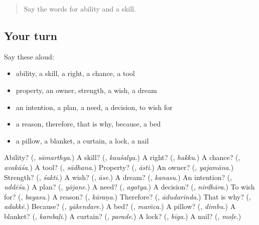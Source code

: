 \label{lesson:KA-R116-second-pass-why-and-the-house}



\begin{quote}
Say the words for ability and a skill.
\end{quote}

\subsection*{Your turn}
Say these aloud:

\begin{itemize}
\raggedright
  \item ability, a skill, a right, a chance, a tool
  \item property, an owner, strength, a wish, a dream
  \item an intention, a plan, a need, a decision, to wish for
  \item a reason, therefore, that is why, because, a bed
  \item a pillow, a blanket, a curtain, a lock, a nail
\end{itemize}

\begin{tcolorbox}[breakable,colback=teal!4,colframe=teal!35!black,title={Before you move on}]
Ability? (\textbf{}, \emph{sāmarthya}.) A skill? (\textbf{}, \emph{kauśalya}.) A right? (\textbf{}, \emph{hakku}.) A chance? (\textbf{}, \emph{avakāśa}.) A tool? (\textbf{}, \emph{sādhana}.) Property? (\textbf{}, \emph{āsti}.) An owner? (\textbf{}, \emph{yajamāna}.) Strength? (\textbf{}, \emph{śakti}.) A wish? (\textbf{}, \emph{āse}.) A dream? (\textbf{}, \emph{kanasu}.) An intention? (\textbf{}, \emph{uddēśa}.) A plan? (\textbf{}, \emph{yōjane}.) A need? (\textbf{}, \emph{agatya}.) A decision? (\textbf{}, \emph{nirdhāra}.) To wish for? (\textbf{}, \emph{bayasu}.) A reason? (\textbf{}, \emph{kāraṇa}.) Therefore? (\textbf{}, \emph{ādudarinda}.) That is why? (\textbf{}, \emph{adakkē}.) Because? (\textbf{}, \emph{yākendare}.) A bed? (\textbf{}, \emph{maṁca}.) A pillow? (\textbf{}, \emph{dimbu}.) A blanket? (\textbf{}, \emph{kambaḷi}.) A curtain? (\textbf{}, \emph{parade}.) A lock? (\textbf{}, \emph{bīga}.) A nail? (\textbf{}, \emph{moḷe}.)
\end{tcolorbox}

